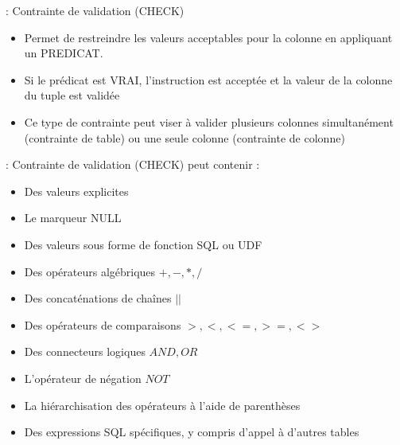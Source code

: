 \documentclass[10pt]{beamer}
\begin{document}
\begin{frame}{\secname : \subsecname}
    Contrainte de validation (CHECK)
    \begin{itemize}
        \item Permet de restreindre les valeurs acceptables pour la colonne en appliquant un PREDICAT.
        \item Si le prédicat est VRAI, l'instruction est acceptée et la valeur de la colonne du tuple est validée
        \item Ce type de contrainte peut viser à valider plusieurs colonnes simultanément (contrainte de table) ou une seule colonne (contrainte de colonne)
    \end{itemize}
\end{frame}

\begin{frame}{\secname : \subsecname}
    Contrainte de validation (CHECK) peut contenir :
    \begin{itemize}
        \item Des valeurs explicites
        \item Le marqueur NULL
        \item Des valeurs sous forme de fonction SQL ou UDF
        \item Des opérateurs algébriques $+, -, *, /$
        \item Des concaténations de chaînes $||$
        \item Des opérateurs de comparaisons $>, <, <=, >=, <>$
        \item Des connecteurs logiques $AND, OR$
        \item L'opérateur de négation $NOT$
        \item La hiérarchisation des opérateurs à l'aide de parenthèses
        \item Des expressions SQL spécifiques, y compris d'appel à d'autres tables
    \end{itemize}
\end{frame}
\end{document}
